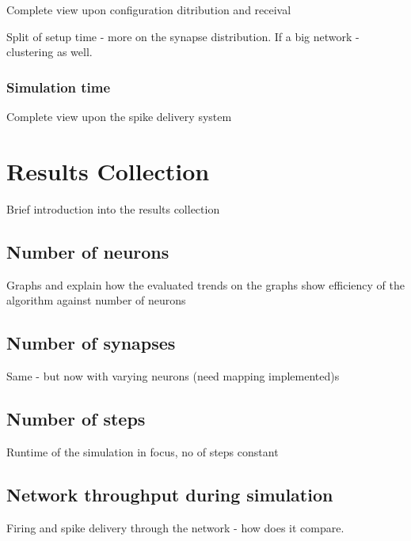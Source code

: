 Complete view upon configuration ditribution and receival

Split of setup time - more on the synapse distribution.
If a big network - clustering as well.

\subsubsection{Simulation time}

Complete view upon the spike delivery system

\section{Results Collection}

Brief introduction into the results collection

\subsection{Number of neurons}

Graphs and explain how the evaluated trends on the graphs show efficiency of the algorithm against number of neurons

\subsection{Number of synapses}

Same - but now with varying neurons (need mapping implemented)s

\subsection{Number of steps}

Runtime of the simulation in focus, no of steps constant

\subsection{Network throughput during simulation}

Firing and spike delivery through the network - how does it compare.
